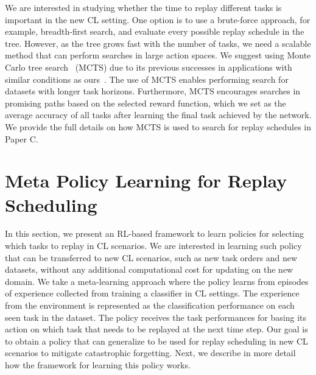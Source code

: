 We are interested in studying whether the time to replay different tasks is important in the new CL setting. One option is to use a brute-force approach, for example, breadth-first search, and evaluate every possible replay schedule in the tree. However, as the tree grows fast with the number of tasks, we need a scalable method that can perform searches in large action spaces. We suggest using Monte Carlo tree search~\cite{coulom2006efficient} (MCTS) due to its previous successes in applications with similar conditions as ours~\cite{browne2012survey, silver2016mastering, chaudhry2018feature}. The use of MCTS enables performing search for datasets with longer task horizons. Furthermore, MCTS encourages searches in promising paths based on the selected reward function, which we set as the average accuracy of all tasks after learning the final task achieved by the network. We provide the full details on how MCTS is used to search for replay schedules in Paper C. 




\section{Meta Policy Learning for Replay Scheduling}
\label{sec:meta_policy_learning_for_replay_scheduling}

In this section, we present an RL-based framework to learn policies for selecting which tasks to replay in CL scenarios. We are interested in learning such policy that can be transferred to new CL scenarios, such as new task orders and new datasets, without any additional computational cost for updating on the new domain. We take a meta-learning approach where the policy learns from episodes of experience collected from training a classifier in CL settings. The experience from the environment is represented as the classification performance on each seen task in the dataset. The policy receives the task performances for basing its action on which task that needs to be replayed at the next time step. Our goal is to obtain a policy that can generalize to be used for replay scheduling in new CL scenarios to mitigate catastrophic forgetting. Next, we describe in more detail how the framework for learning this policy works.

